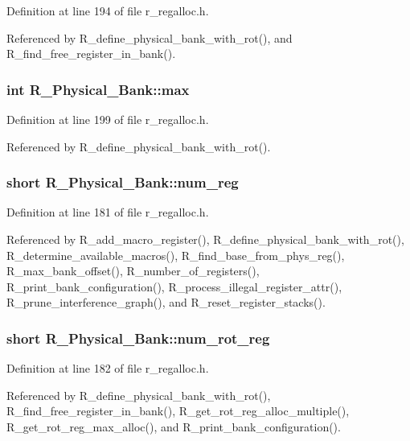 Definition at line 194 of file r\_\-regalloc.h.

Referenced by R\_\-define\_\-physical\_\-bank\_\-with\_\-rot(), and R\_\-find\_\-free\_\-register\_\-in\_\-bank().
\subsubsection{\setlength{\rightskip}{0pt plus 5cm}int \bf{R\_\-Physical\_\-Bank::max}}\label{structR__Physical__Bank_a2527f118c4fcbcc15225e25b2671fed}




Definition at line 199 of file r\_\-regalloc.h.

Referenced by R\_\-define\_\-physical\_\-bank\_\-with\_\-rot().
\subsubsection{\setlength{\rightskip}{0pt plus 5cm}short \bf{R\_\-Physical\_\-Bank::num\_\-reg}}\label{structR__Physical__Bank_f503ae63f0a2adc1a850edb54e816aeb}




Definition at line 181 of file r\_\-regalloc.h.

Referenced by R\_\-add\_\-macro\_\-register(), R\_\-define\_\-physical\_\-bank\_\-with\_\-rot(), R\_\-determine\_\-available\_\-macros(), R\_\-find\_\-base\_\-from\_\-phys\_\-reg(), R\_\-max\_\-bank\_\-offset(), R\_\-number\_\-of\_\-registers(), R\_\-print\_\-bank\_\-configuration(), R\_\-process\_\-illegal\_\-register\_\-attr(), R\_\-prune\_\-interference\_\-graph(), and R\_\-reset\_\-register\_\-stacks().
\subsubsection{\setlength{\rightskip}{0pt plus 5cm}short \bf{R\_\-Physical\_\-Bank::num\_\-rot\_\-reg}}\label{structR__Physical__Bank_353a159082bc284531fd6f00e4a62bd3}




Definition at line 182 of file r\_\-regalloc.h.

Referenced by R\_\-define\_\-physical\_\-bank\_\-with\_\-rot(), R\_\-find\_\-free\_\-register\_\-in\_\-bank(), R\_\-get\_\-rot\_\-reg\_\-alloc\_\-multiple(), R\_\-get\_\-rot\_\-reg\_\-max\_\-alloc(), and R\_\-print\_\-bank\_\-configuration().
